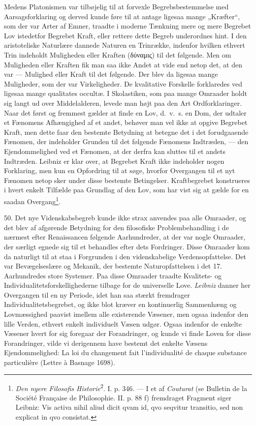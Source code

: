 \documentclass[12pt,a4paper]{book}
\newcommand{\apage}[1]{\marginnote{\footnotesize\textit{[#1]}}}
\begin{document}
Medens Platonismen var tilbøjelig til at forvexle Begrebsbestemmelse med
Aarsagsforklaring og derved kunde føre til at antage ligesaa mange
„Kræfter“, som der var Arter af Emner, traadte i moderne Tænkning mere og
mere Begrebet Lov istedetfor Begrebet Kraft, eller rettere dette Begreb
underordnes hint. I den aristoteliske Naturlære dannede Naturen en
Trinrække, indenfor hvilken ethvert Trin indeholdt Muligheden eller
Kraften (δύναμις) til det følgende. Men om Muligheden eller Kraften fik
man saa ikke Andet at vide end netop det, at den var --- Mulighed eller
Kraft til det følgende. Der blev da ligesaa mange Muligheder, som der var
Virkeligheder. De kvalitative Forskelle forklaredes ved ligesaa mange
qualitates occultæ. I Skolastiken, som paa mange Omraader holdt sig langt
ud over Middelalderen, levede man højt paa den Art Ordforklaringer. Naar
det først og fremmest gælder at finde en Lov, d.\ v.\ s. en Dom, der
udtaler et Fænomens Afhængighed af et andet, behøver man vel ikke at
opgive Begrebet Kraft, men dette faar den bestemte \apage{132} Betydning at betegne
det i det forudgaaende Fænomen, der indeholder Grunden til det følgende
Fænomens Indtræden, --- den Ejendommelighed ved et Fænomen, at der derfra
kan sluttes til et andets Indtræden. Leibniz er klar over, at Begrebet
Kraft ikke indeholder nogen Forklaring, men kun en Opfordring til at
søge, hvorfor Overgangen til et nyt Fænomen netop sker under disse
bestemte Betingelser. Kraftbegrebet konstrueres i hvert enkelt Tilfælde
paa Grundlag af den Lov, som har vist sig at gælde for en saadan
Overgang\footnote{\emph{Den nyere Filosofis Historie}\textsuperscript{2}.
I. p. 346. --- I et af \emph{Couturat} (se Bulletin de la Société
Française de Philosophie. II. p. 88 f) fremdraget Fragment siger Leibniz:
Vis activa nihil aliud dicit qvam id, qvo seqvitur transitio, sed non
explicat in qvo consistat.}.

50. Det nye Videnskabsbegreb kunde ikke strax anvendes paa alle
Omraader, og det blev af afgørende Betydning for den filosofiske
Problembehandling i de nærmest efter Renaissancen følgende Aarhundreder,
at der var nogle Omraader, der særligt egnede sig til et behandles efter
dets Fordringer. Disse Omraader kom da naturligt til at staa i
Forgrunden i den videnskabelige Verdensopfattelse. Det var
Bevægelseslære og Mekanik, der bestemte Naturopfattelsen i det 17.
Aarhundredes store Systemer. Paa disse Omraader traadte Kvalitets- og
Individualitetsforskellighederne tilbage for de universelle Love.
\emph{Leibniz} danner her Overgangen til en ny Periode, idet han saa
stærkt fremdrager Individualitetsbegrebet, og ikke blot kræver en
kontinuerlig Sammenhæng og Lovmæssighed paavist imellem alle existerende
Væsener, men ogsaa indenfor den lille Verden, ethvert enkelt individuelt
Væsen udgør. Ogsaa indenfor de enkelte Væsener hvert for sig foregaar
der Forandringer, og kunde vi finde Loven for disse Forandringer, vilde
vi derigennem have bestemt det enkelte Væsens Ejendommelighed: La
loi du changement fait l'individualité de chaque substance particulière
(Lettre à Basnage 1698).
\end{document}
